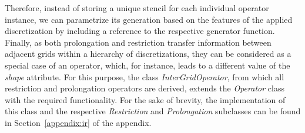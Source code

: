 Therefore, instead of storing a unique stencil for each individual operator instance, we can parametrize its generation based on the features of the applied discretization by including a reference to the respective generator function.
Finally, as both prolongation and restriction transfer information between adjacent grids within a hierarchy of discretizations, they can be considered as a special case of an operator, which, for instance, leads to a different value of the \emph{shape} attribute.
For this purpose, the class \emph{InterGridOperator}, from which all restriction and prolongation operators are derived, extends the \emph{Operator} class with the required functionality.
For the sake of brevity, the implementation of this class and the respective \emph{Restriction} and \emph{Prolongation} subclasses can be found in Section~\ref{appendix:ir} of the appendix.

